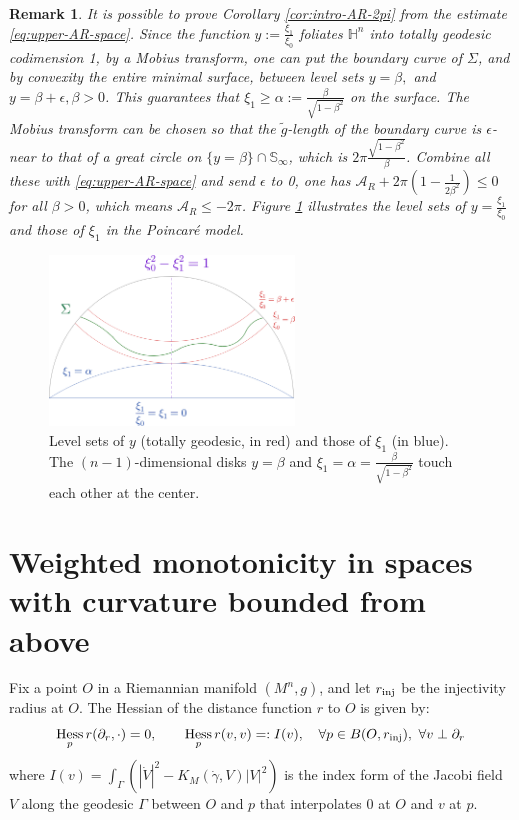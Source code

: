 \documentclass[11pt]{article}
\newtheorem{remark}[theorem]{Remark}
\DeclareMathOperator{\hess}{Hess}
\begin{document}
\begin{remark}
\label{rem:space-est}
It is possible to prove Corollary \ref{cor:intro-AR-2pi}
from the estimate \eqref{eq:upper-AR-space}. Since the function \(y:=\frac{\xi_1}{\xi_0}\)
foliates \(\mathbb{H}^n\) 
into totally geodesic codimension 1, by a Mobius transform, one can put the
boundary curve of \(\Sigma\), and by convexity the entire minimal surface, between level sets \(y=\beta,\) and \(y=\beta+\epsilon, \beta >0\). 
This guarantees that \(\xi_1\geq\alpha :=
\frac{\beta}{\sqrt{1-\beta^2}}\) on the surface. 
The Mobius transform can be chosen so that the \(\tilde g\)-length of the boundary curve is \(\epsilon\)-near to that of a great
circle on \(\{y=\beta\}\cap \mathbb{S}_\infty\), which is \(2\pi
\frac{\sqrt{1-\beta^2}}{\beta}\). Combine all these with \eqref{eq:upper-AR-space} and send
\(\epsilon\) to 0, one has
\(\mathcal{A}_R + 2\pi (1 - \frac{1}{2\beta^2})\leq 0\) for all \(\beta >0\), which
means \(\mathcal{A}_R\leq -2\pi\). Figure \ref{fig:space-est} illustrates the level sets of \(y = \frac{\xi_1}{\xi_0}\)
and those of \(\xi_1\) in the Poincaré model.
\end{remark}

\begin{figure}[hbt!]
    \centering
    \includegraphics[width=6.5cm]{2021-04-28-space-est.png} 
    \caption{Level sets of \( y \) (totally geodesic, in red) and those of \( \xi_1 \) (in blue). The \( (n-1) \)-dimensional disks \( y=\beta\) and \( \xi_1 = \alpha = \frac{\beta}{\sqrt{1-\beta^2}} \) touch each other at the center.}
    \label{fig:space-est}
\end{figure}

\section{Weighted monotonicity in spaces with curvature bounded from above}
\label{sec:org2ac913f}
Fix a point \(O\) in a Riemannian manifold \((M^n,g)\), and let \(r_{\rm inj}\) be the
injectivity radius at \(O\). The Hessian of the distance function \(r\) to \(O\) is
given by:
\begin{equation}
\label{eq:hess-r}
\hess_p r (\partial_r, \cdot) =0, \qquad \hess_p r (v, v)=: I(v), \quad\forall p\in B(O,r_{\rm inj}),\ \forall v\perp \partial_r
\end{equation}
where \(I(v)=\int_{\Gamma}\left(|\dot V|^2 - K_M(\dot\gamma,V)|V|^2\right)\) is the index
form of the Jacobi field \(V\) along the geodesic \(\Gamma\) between \(O\) and \(p\) that
interpolates \(0\) at \(O\) and \(v\) at \(p\). 
\end{document}
